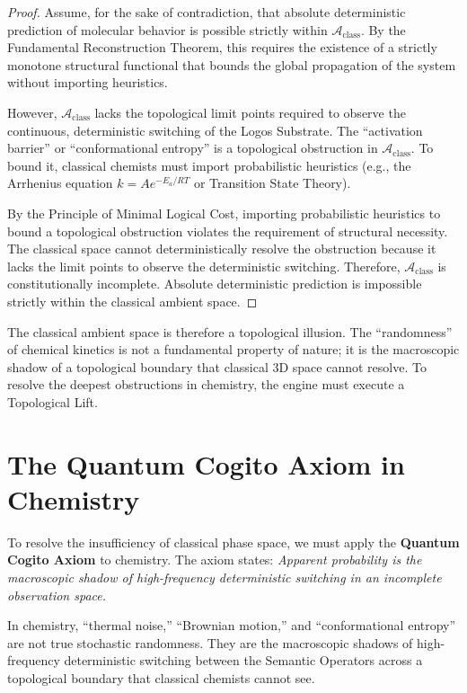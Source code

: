 \documentclass[11pt,openany]{extbook}
\theoremstyle{plain}
\theoremstyle{definition}
\begin{document}
\begin{proof}
Assume, for the sake of contradiction, that absolute deterministic prediction of molecular behavior is possible strictly within $\mathcal{A}_{\text{class}}$. By the Fundamental Reconstruction Theorem, this requires the existence of a strictly monotone structural functional that bounds the global propagation of the system without importing heuristics.

However, $\mathcal{A}_{\text{class}}$ lacks the topological limit points required to observe the continuous, deterministic switching of the Logos Substrate. The ``activation barrier'' or ``conformational entropy'' is a topological obstruction in $\mathcal{A}_{\text{class}}$. To bound it, classical chemists must import probabilistic heuristics (e.g., the Arrhenius equation $k = A e^{-E_a/RT}$ or Transition State Theory).

By the Principle of Minimal Logical Cost, importing probabilistic heuristics to bound a topological obstruction violates the requirement of structural necessity. The classical space cannot deterministically resolve the obstruction because it lacks the limit points to observe the deterministic switching. Therefore, $\mathcal{A}_{\text{class}}$ is constitutionally incomplete. Absolute deterministic prediction is impossible strictly within the classical ambient space.
\end{proof}

The classical ambient space is therefore a topological illusion. The ``randomness'' of chemical kinetics is not a fundamental property of nature; it is the macroscopic shadow of a topological boundary that classical 3D space cannot resolve. To resolve the deepest obstructions in chemistry, the engine must execute a Topological Lift.

\section{The Quantum Cogito Axiom in Chemistry}

To resolve the insufficiency of classical phase space, we must apply the \textbf{Quantum Cogito Axiom} to chemistry. The axiom states: \emph{Apparent probability is the macroscopic shadow of high-frequency deterministic switching in an incomplete observation space.}

In chemistry, ``thermal noise,'' ``Brownian motion,'' and ``conformational entropy'' are not true stochastic randomness. They are the macroscopic shadows of high-frequency deterministic switching between the Semantic Operators across a topological boundary that classical chemists cannot see.
\end{document}
